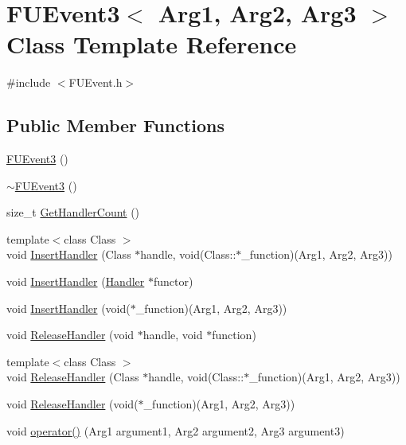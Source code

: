 \hypertarget{classFUEvent3}{
\section{FUEvent3$<$ Arg1, Arg2, Arg3 $>$ Class Template Reference}
\label{classFUEvent3}
}


{\ttfamily \#include $<$FUEvent.h$>$}

\subsection*{Public Member Functions}
\begin{DoxyCompactItemize}
\item 
\hyperlink{classFUEvent3_a7eb68e0e07ea01fb0a801a123b8b8d1f}{FUEvent3} ()
\item 
\hyperlink{classFUEvent3_a7afabfde33ad2aa610973b5380a70e27}{$\sim$FUEvent3} ()
\item 
size\_\-t \hyperlink{classFUEvent3_a890ac286cc0587091e363969df885671}{GetHandlerCount} ()
\item 
{\footnotesize template$<$class Class $>$ }\\void \hyperlink{classFUEvent3_a990760fd33d52c29b39f215aa1f5e818}{InsertHandler} (Class $\ast$handle, void(Class::$\ast$\_\-function)(Arg1, Arg2, Arg3))
\item 
void \hyperlink{classFUEvent3_af68e6fd408e58e6f8900acef372e91d9}{InsertHandler} (\hyperlink{classIFunctor3}{Handler} $\ast$functor)
\item 
void \hyperlink{classFUEvent3_a0e967e2e4d305c1ae7fcb7db2ec42f08}{InsertHandler} (void($\ast$\_\-function)(Arg1, Arg2, Arg3))
\item 
void \hyperlink{classFUEvent3_aeccccf490f3daae050f53aced75bf4ec}{ReleaseHandler} (void $\ast$handle, void $\ast$function)
\item 
{\footnotesize template$<$class Class $>$ }\\void \hyperlink{classFUEvent3_a5d3b77502a201c79d102af11243b18ec}{ReleaseHandler} (Class $\ast$handle, void(Class::$\ast$\_\-function)(Arg1, Arg2, Arg3))
\item 
void \hyperlink{classFUEvent3_afe7c0bec668acd3355a125d5424308ff}{ReleaseHandler} (void($\ast$\_\-function)(Arg1, Arg2, Arg3))
\item 
void \hyperlink{classFUEvent3_a3c8c9064ff2b60d1d0e228dd8190e8ae}{operator()} (Arg1 argument1, Arg2 argument2, Arg3 argument3)
\end{DoxyCompactItemize}


